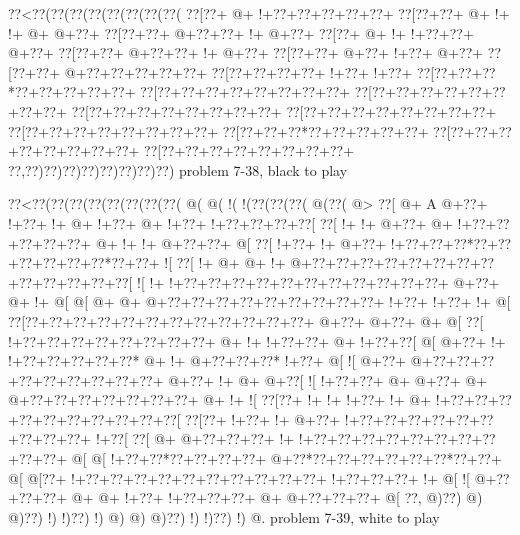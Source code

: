 \vbox{\vbox{\goo
\0??<\0??(\0??(\0??(\0??(\0??(\0??(\0??(\0??(
\0??[\0??+\- @+\- !+\0??+\0??+\0??+\0??+\0??+
\0??[\0??+\0??+\- @+\- !+\- !+\- @+\- @+\0??+
\0??[\0??+\0??+\- @+\0??+\0??+\- !+\- @+\0??+
\0??[\0??+\- @+\- !+\- !+\0??+\0??+\- @+\0??+
\0??[\0??+\0??+\- @+\0??+\0??+\- !+\- @+\0??+
\0??[\0??+\0??+\- @+\0??+\- !+\0??+\- @+\0??+
\0??[\0??+\0??+\- @+\0??+\0??+\0??+\0??+\0??+
\0??[\0??+\0??+\0??+\0??+\- !+\0??+\- !+\0??+
\0??[\0??+\0??+\0??*\0??+\0??+\0??+\0??+\0??+
\0??[\0??+\0??+\0??+\0??+\0??+\0??+\0??+\0??+
\0??[\0??+\0??+\0??+\0??+\0??+\0??+\0??+\0??+
\0??[\0??+\0??+\0??+\0??+\0??+\0??+\0??+\0??+
\0??[\0??+\0??+\0??+\0??+\0??+\0??+\0??+\0??+
\0??[\0??+\0??+\0??+\0??+\0??+\0??+\0??+\0??+
\0??[\0??+\0??+\0??*\0??+\0??+\0??+\0??+\0??+
\0??[\0??+\0??+\0??+\0??+\0??+\0??+\0??+\0??+
\0??[\0??+\0??+\0??+\0??+\0??+\0??+\0??+\0??+
\0??,\0??)\0??)\0??)\0??)\0??)\0??)\0??)\0??)
}
\hfil problem 7-38, black to play\hfil\break
}

\vbox{\vbox{\goo
\0??<\0??(\0??(\0??(\0??(\0??(\0??(\0??(\0??(\- @(\- @(\- !(\- !(\0??(\0??(\0??(\- @(\0??(\- @>
\0??[\- @+\!  A\- @+\0??+\- !+\0??+\- !+\- @+\- !+\0??+\- @+\- !+\0??+\- !+\0??+\0??+\0??+\0??[
\0??[\- !+\- !+\- @+\0??+\- @+\- !+\0??+\0??+\0??+\0??+\0??+\- @+\- !+\- !+\- @+\0??+\0??+\- @[
\0??[\- !+\0??+\- !+\- @+\0??+\- !+\0??+\0??+\0??*\0??+\0??+\0??+\0??+\0??+\0??*\0??+\0??+\- ![
\0??[\- !+\- @+\- @+\- !+\- @+\0??+\0??+\0??+\0??+\0??+\0??+\0??+\0??+\0??+\0??+\0??+\0??+\0??[
\- ![\- !+\- !+\0??+\0??+\0??+\0??+\0??+\0??+\0??+\0??+\0??+\0??+\0??+\- @+\0??+\- @+\- !+\- @[
\- @[\- @+\- @+\- @+\0??+\0??+\0??+\0??+\0??+\0??+\0??+\0??+\0??+\- !+\0??+\- !+\0??+\- !+\- @[
\0??[\0??+\0??+\0??+\0??+\0??+\0??+\0??+\0??+\0??+\0??+\0??+\0??+\- @+\0??+\- @+\0??+\- @+\- @[
\0??[\- !+\0??+\0??+\0??+\0??+\0??+\0??+\0??+\0??+\- @+\- !+\- !+\0??+\0??+\- @+\- !+\0??+\0??[
\- @[\- @+\0??+\- !+\- !+\0??+\0??+\0??+\0??+\0??*\- @+\- !+\- @+\0??+\0??+\0??*\- !+\0??+\- @[
\- ![\- @+\0??+\- @+\0??+\0??+\0??+\0??+\0??+\0??+\0??+\0??+\0??+\- @+\0??+\- !+\- @+\- @+\0??[
\- ![\- !+\0??+\0??+\- @+\- @+\0??+\- @+\- @+\0??+\0??+\0??+\0??+\0??+\0??+\0??+\- @+\- !+\- ![
\0??[\0??+\- !+\- !+\- !+\0??+\- !+\- @+\- !+\0??+\0??+\0??+\0??+\0??+\0??+\0??+\0??+\0??+\0??[
\0??[\0??+\- !+\0??+\- !+\- @+\0??+\- !+\0??+\0??+\0??+\0??+\0??+\0??+\0??+\0??+\0??+\- !+\0??[
\0??[\- @+\- @+\0??+\0??+\0??+\- !+\- !+\0??+\0??+\0??+\0??+\0??+\0??+\0??+\0??+\0??+\0??+\- @[
\- @[\- !+\0??+\0??*\0??+\0??+\0??+\0??+\- @+\0??*\0??+\0??+\0??+\0??+\0??+\0??*\0??+\0??+\- @[
\- @[\0??+\- !+\0??+\0??+\0??+\0??+\0??+\0??+\0??+\0??+\0??+\0??+\- !+\0??+\0??+\0??+\- !+\- @[
\- ![\- @+\0??+\0??+\0??+\- @+\- @+\- !+\0??+\- !+\0??+\0??+\0??+\- @+\- @+\0??+\0??+\0??+\- @[
\0??,\- @)\0??)\- @)\- @)\0??)\- !)\- !)\0??)\- !)\- @)\- @)\- @)\0??)\- !)\- !)\0??)\- !)\- @.
}
\hfil problem 7-39, white to play\hfil\break
}

